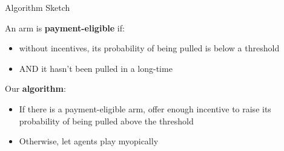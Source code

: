 \documentclass[serif]{beamer}
\begin{document}



\begin{frame}{Algorithm Sketch}

An arm is \textbf{payment-eligible} if:
\begin{itemize}
\item without incentives, its probability of being pulled is below a threshold
\item AND it hasn't been pulled in a long-time
\end{itemize}
\vspace{0.5cm}

Our \textbf{algorithm}:
\begin{itemize}
\item If there is a payment-eligible arm, offer enough incentive to raise its probability of being pulled above the threshold
\item Otherwise, let agents play myopically
\end{itemize}
\end{frame}
\end{document}
